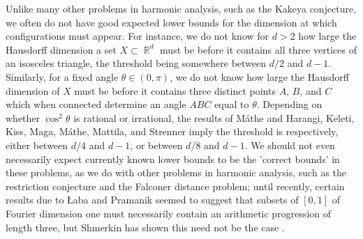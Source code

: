 \documentclass[11pt]{article}
\DeclareMathOperator{\QQ}{\mathbb{Q}}
\DeclareMathOperator{\RR}{\mathbb{R}}
\begin{document}
Unlike many other problems in harmonic analysis, such as the Kakeya conjecture, we often do not have good expected lower bounds for the dimension at which configurations must appear.
%
For instance, we do not know for $d > 2$ how large the Hausdorff dimension a set $X \subset \RR^d$ must be before it contains all three vertices of an isosceles triangle, the threshold being somewhere between $d/2$ and $d-1$. Similarly, for a fixed angle $\theta \in (0,\pi)$, we do not know how large the Hausdorff dimension of $X$ must be before it contains three distinct points $A$, $B$, and $C$ which when connected determine an angle $ABC$ equal to $\theta$. Depending on whether $\cos^2 \theta$ is rational or irrational, the results of M\'{a}the \cite{Mathe} and Harangi, Keleti, Kiss, Maga, M\'{a}the, Mattila, and Strenner \cite{Harangi} imply the threshold is respectively, either between $d/4$ and $d-1$, or between $d/8$ and $d-1$. 
We should not even necessarily expect currently known lower bounds to be the 'correct bounds' in these problems, as we do with other problems in harmonic analysis, such as the restriction conjecture and the Falconer distance problem; until recently, certain results due to {\L}aba and Pramanik \cite{LabaPramanik} seemed to suggest that subsets of $[0,1]$ of Fourier dimension one must necessarily contain an arithmetic progression of length three, but Shmerkin has shown this need not be the case \cite{Shmerkin}.
\end{document}
